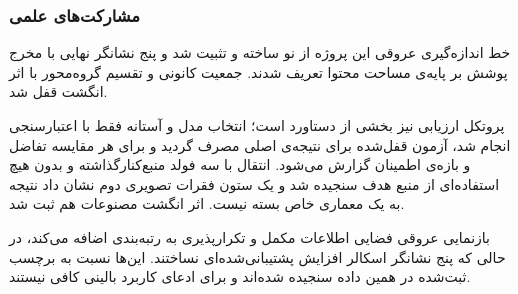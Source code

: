 \subsubsection{مشارکت‌های علمی}

خط اندازه‌گیری عروقی این پروژه از نو ساخته و تثبیت شد و پنج نشانگر نهایی با مخرج پوشش بر پایه‌ی مساحت محتوا تعریف شدند. جمعیت کانونی و تقسیم گروه‌محور با اثر انگشت  قفل شد.

پروتکل ارزیابی نیز بخشی از دستاورد است؛ انتخاب مدل و آستانه فقط با اعتبارسنجی انجام شد، آزمون قفل‌شده برای نتیجه‌ی اصلی مصرف گردید و برای هر مقایسه تفاضل و بازه‌ی اطمینان گزارش می‌شود. انتقال با سه فولد منبع‌کنارگذاشته و بدون هیچ استفاده‌ای از منبع هدف سنجیده شد و یک ستون فقرات تصویری دوم نشان داد نتیجه به یک معماری خاص بسته نیست. اثر انگشت مصنوعات هم ثبت شد.

بازنمایی عروقی فضایی اطلاعات مکمل و تکرارپذیری به رتبه‌بندی اضافه می‌کند، در حالی که پنج نشانگر اسکالر افزایش پشتیبانی‌شده‌ای نساختند. این‌ها نسبت به برچسب ثبت‌شده در همین داده سنجیده شده‌اند و برای ادعای کاربرد بالینی کافی نیستند.
